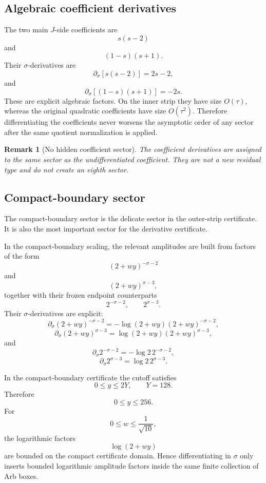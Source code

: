 \documentclass[11pt]{article}
\newtheorem{remark}[theorem]{Remark}
\begin{document}
\subsection{Algebraic coefficient derivatives}

The two main \(J\)-side coefficients are
\[
        s(s-2)
\]
and
\[
        (1-s)(s+1).
\]
Their \(\sigma\)-derivatives are
\[
        \partial_\sigma[s(s-2)]
        =
        2s-2,
\]
and
\[
        \partial_\sigma[(1-s)(s+1)]
        =
        -2s.
\]
These are explicit algebraic factors.  On the inner strip they have size
\(O(\tau)\), whereas the original quadratic coefficients have size
\(O(\tau^2)\).  Therefore differentiating the coefficients never worsens the
asymptotic order of any sector after the same quotient normalization is
applied.

\begin{remark}[No hidden coefficient sector]
The coefficient derivatives are assigned to the same sector as the
undifferentiated coefficient.  They are not a new residual type and do not
create an eighth sector.
\end{remark}

\subsection{Compact-boundary sector}

The compact-boundary sector is the delicate sector in the outer-strip
certificate.  It is also the most important sector for the derivative
certificate.

In the compact-boundary scaling, the relevant amplitudes are built from factors
of the form
\[
        (2+wy)^{-\sigma-2}
\]
and
\[
        (2+wy)^{\sigma-3},
\]
together with their frozen endpoint counterparts
\[
        2^{-\sigma-2},
        \qquad
        2^{\sigma-3}.
\]
Their \(\sigma\)-derivatives are explicit:
\[
        \partial_\sigma(2+wy)^{-\sigma-2}
        =
        -\log(2+wy)(2+wy)^{-\sigma-2},
\]
\[
        \partial_\sigma(2+wy)^{\sigma-3}
        =
        \log(2+wy)(2+wy)^{\sigma-3},
\]
and
\[
        \partial_\sigma 2^{-\sigma-2}
        =
        -\log2\,2^{-\sigma-2},
\]
\[
        \partial_\sigma 2^{\sigma-3}
        =
        \log2\,2^{\sigma-3}.
\]

In the compact-boundary certificate the cutoff satisfies
\[
        0\le y\le2Y,
        \qquad
        Y=128.
\]
Therefore
\[
        0\le y\le256.
\]
For
\[
        0\le w\le\frac1{\sqrt{10}},
\]
the logarithmic factors
\[
        \log(2+wy)
\]
are bounded on the compact certificate domain.  Hence differentiating in
\(\sigma\) only inserts bounded logarithmic amplitude factors inside the same
finite collection of Arb boxes.
\end{document}
